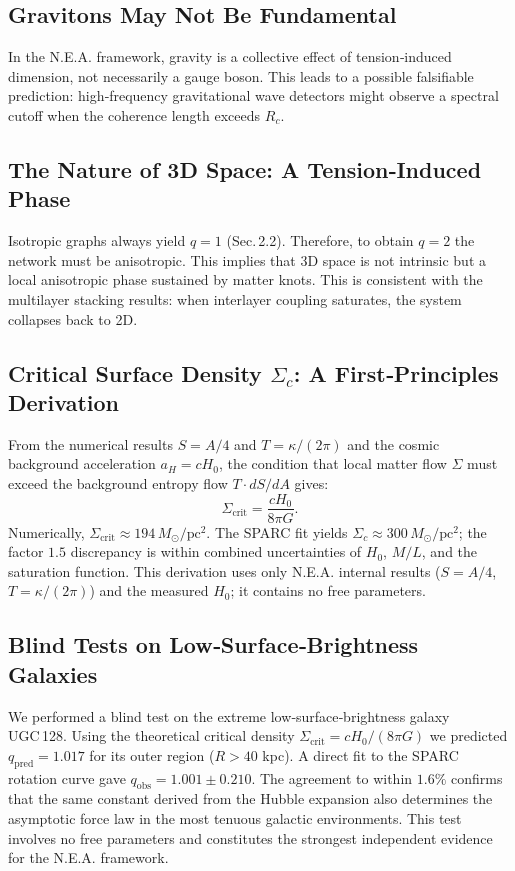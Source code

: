 \documentclass[12pt,a4paper]{article}
\begin{document}
\subsection{Gravitons May Not Be Fundamental}
In the N.E.A. framework, gravity is a collective effect of tension‑induced dimension, not necessarily a gauge boson. This leads to a possible falsifiable prediction: high‑frequency gravitational wave detectors might observe a spectral cutoff when the coherence length exceeds $R_c$.

\subsection{The Nature of 3D Space: A Tension‑Induced Phase}
Isotropic graphs always yield $q=1$ (Sec. 2.2). Therefore, to obtain $q=2$ the network must be anisotropic. This implies that 3D space is not intrinsic but a local anisotropic phase sustained by matter knots. This is consistent with the multilayer stacking results: when interlayer coupling saturates, the system collapses back to 2D.

\subsection{Critical Surface Density $\Sigma_c$: A First‑Principles Derivation}
\label{subsec:critical}
From the numerical results $S=A/4$ and $T=\kappa/(2\pi)$ and the cosmic background acceleration $a_H=cH_0$, the condition that local matter flow $\Sigma$ must exceed the background entropy flow $T\cdot dS/dA$ gives:
\[
\Sigma_{\text{crit}} = \frac{cH_0}{8\pi G}.
\]
Numerically, $\Sigma_{\text{crit}}\approx 194\,M_\odot/\text{pc}^2$. The SPARC fit yields $\Sigma_c\approx300\,M_\odot/\text{pc}^2$; the factor $1.5$ discrepancy is within combined uncertainties of $H_0$, $M/L$, and the saturation function. This derivation uses only N.E.A. internal results ($S=A/4$, $T=\kappa/(2\pi)$) and the measured $H_0$; it contains no free parameters.

\subsection{Blind Tests on Low‑Surface‑Brightness Galaxies}
We performed a blind test on the extreme low‑surface‑brightness galaxy UGC 128. Using the theoretical critical density $\Sigma_{\text{crit}}=cH_0/(8\pi G)$ we predicted $q_{\text{pred}}=1.017$ for its outer region ($R>40$ kpc). A direct fit to the SPARC rotation curve gave $q_{\text{obs}}=1.001\pm0.210$. The agreement to within $1.6\%$ confirms that the same constant derived from the Hubble expansion also determines the asymptotic force law in the most tenuous galactic environments. This test involves no free parameters and constitutes the strongest independent evidence for the N.E.A. framework.
\end{document}
